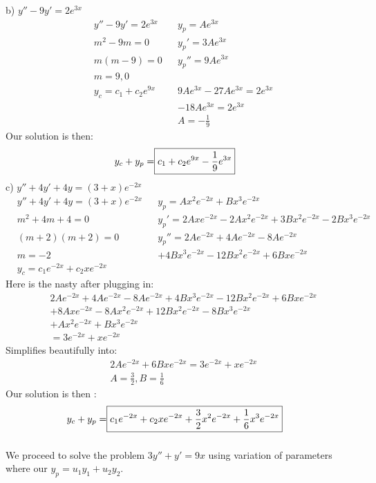 \documentclass{article}
\begin{document}
b) $ y'' - 9y' = 2e^{3x }$
\begin{align*}
    & y'' - 9y' = 2e^{3x} && y_p = Ae^{3x}\\
    & m^2 - 9m = 0 && y_p' = 3Ae^{3x}\\
    & m(m-9) = 0 && y_p'' = 9Ae^{3x} \\
    & m = 9, 0 \\
    & y_c = c_1 + c_2e^{9x} && 9Ae^{3x} - 27Ae^{3x} = 2e^{3x} \\
    &&& -18Ae^{3x} = 2e^{3x} \\
    &&& A = -\frac{1}{9}
\end{align*}
Our solution is then:
\begin{align*}
    y_c + y_p = \Aboxed{c_1 + c_2e^{9x} - \frac{1}{9}e^{3x}}
\end{align*}
c) $ y'' + 4y' + 4y = (3+x)e^{-2x}$
\begin{align*}
    & y'' + 4y' + 4y = (3+x)e^{-2x} && y_p = Ax^2e^{-2x} + Bx^3e^{-2x}\\
    & m^2 + 4m + 4 = 0 && y_p' = 2Axe^{-2x} - 2Ax^2e^{-2x} + 3Bx^2e^{-2x} - 2Bx^3e^{-2x} \\
    & (m+2)(m+2) = 0 && y_p''= 2Ae^{-2x} + 4Ae^{-2x} - 8Ae^{-2x}\\
    & m = -2 && +4Bx^3e^{-2x} - 12Bx^2e^{-2x} + 6Bxe^{-2x} \\
    & y_c = c_1e^{-2x} + c_2xe^{-2x}
\end{align*}
Here is the nasty after plugging in:
\begin{align*}
    & 2Ae^{-2x} + 4Ae^{-2x} - 8Ae^{-2x} + 4Bx^3e^{-2x} - 12Bx^2e^{-2x} + 6Bxe^{-2x} \\
    & + 8Axe^{-2x} - 8Ax^2e^{-2x} + 12Bx^2e^{-2x} - 8Bx^3e^{-2x} \\
    & + Ax^2e^{-2x} + Bx^3e^{-2x} \\
    & = 3e^{-2x} + xe^{-2x}
\end{align*}
Simplifies beautifully into:
\begin{align*}
    & 2Ae^{-2x} + 6Bxe^{-2x} =  3e^{-2x} + xe^{-2x} \\
    & A = \frac{3}{2}, B = \frac{1}{6}
\end{align*}
Our solution is then :
\begin{align*}
    y_c + y_p = \Aboxed{c_1e^{-2x} + c_2xe^{-2x} + \frac{3}{2}x^2e^{-2x} + \frac{1}{6}x^3e^{-2x}}
\end{align*}

\setcounter{subsection}{6}
\setcounter{subsubsection}{0}
\subsubsection{}
We proceed to solve the problem $ 3y'' + y' = 9x $ using variation of parameters where our $ y_p = u_1y_1 + u_2y_2$.
\end{document}
